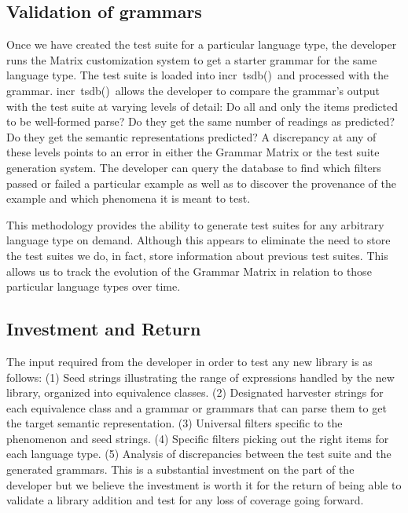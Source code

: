 \documentclass[11pt]{article}
\newcommand{\itsdb}{\mbox{\sf \lbrack incr tsdb()\rbrack}}
\begin{document}
\subsection{Validation of grammars}


Once we have created the test suite for a particular language type,
the developer runs the Matrix customization system to get a starter
grammar for the same language type.  The test suite is loaded into
\itsdb\ and processed with the grammar.  \itsdb\ allows the developer
to compare the grammar's output with the test suite at varying levels
of detail: Do all and only the items predicted to be well-formed
parse?  Do they get the same number of readings as predicted?  Do they
get the semantic representations predicted?  A discrepancy at any of
these levels points to an error in either the Grammar Matrix or the
test suite generation system.  The developer can query the database to
find which filters passed or failed a particular example as well as to
discover the provenance of the example and which phenomena it is meant
to test.


This methodology provides the ability to generate test suites for any
arbitrary language type on demand.  Although this appears to eliminate
the need to store the test suites we do, in fact, store information
about previous test suites. This allows us to track the evolution of
the Grammar Matrix in relation to those particular language types over
time.

\subsection{Investment and Return}

The input required from the developer in order to
test any new library is as follows:
(1) Seed strings illustrating the range of expressions
handled by the new library, organized into equivalence
classes.
(2) Designated harvester strings for each equivalence class
and a grammar or grammars that can parse them to get
the target semantic representation.
(3) Universal filters specific to the phenomenon and
seed strings.
(4) Specific filters picking out the right items for
each language type.
(5) Analysis of discrepancies between the test suite
and the generated grammars.
This is a substantial investment on the part of the developer 
but we believe the investment is worth it for the return of being 
able to validate a library addition and test for any loss of coverage 
going forward.
\end{document}
